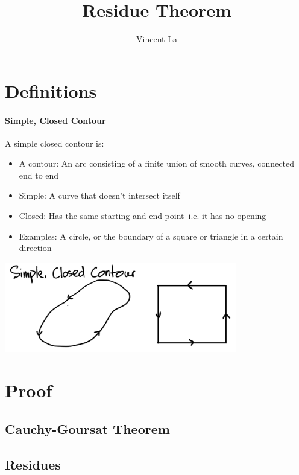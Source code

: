 \documentclass[]{article}
\title{Residue Theorem}
\author{Vincent La}
\begin{document}
\maketitle

\begin{abstract}

\end{abstract}

\section{Definitions}
\paragraph{Simple, Closed Contour}
A simple closed contour is:
\begin{itemize}
	\item A contour: An arc consisting of a finite union of smooth curves, connected end to end
	\item Simple: A curve that doesn't intersect itself
	\item Closed: Has the same starting and end point--i.e. it has no opening
	\item Examples: A circle, or the boundary of a square or triangle in a certain direction
\end{itemize}

\begin{center}
	\includegraphics[width=4in]{SimpleClosedContour.png}
\end{center}

\section{Proof}
\subsection{Cauchy-Goursat Theorem}
\subsection{Residues}
\end{document}
